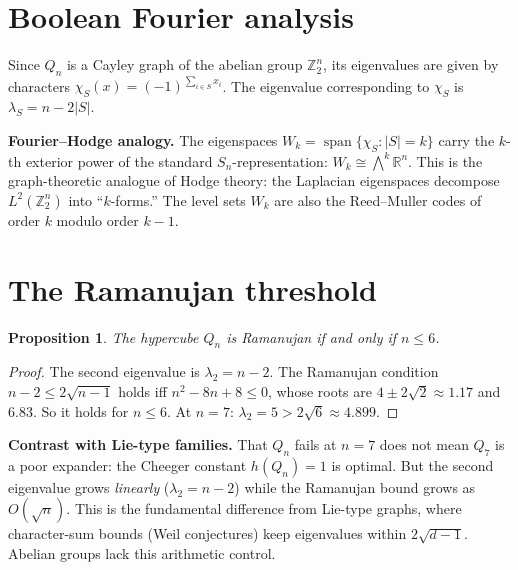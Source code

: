 \documentclass[11pt,a4paper]{article}
\theoremstyle{plain}
\newtheorem{proposition}[theorem]{Proposition}
\theoremstyle{definition}
\theoremstyle{remark}
\newcommand{\Z}{\mathbb{Z}}
\newcommand{\R}{\mathbb{R}}
\begin{document}
\section{Boolean Fourier analysis}

Since $Q_n$ is a Cayley graph of the abelian group $\Z_2^n$, its eigenvalues
are given by characters $\chi_S(x) = (-1)^{\sum_{i \in S} x_i}$.
The eigenvalue corresponding to $\chi_S$ is $\lambda_S = n - 2|S|$.

\begin{tcolorbox}[colback=yellow!10, colframe=yellow!10,
  boxrule=0pt, sharp corners]
\textbf{Fourier--Hodge analogy.}
The eigenspaces $W_k = \operatorname{span}\{\chi_S : |S| = k\}$ carry
the $k$-th exterior power of the standard $S_n$-representation:
$W_k \cong \bigwedge^k \R^n$. This is the graph-theoretic analogue of
Hodge theory: the Laplacian eigenspaces decompose $L^2(\Z_2^n)$ into
``$k$-forms.'' The level sets $W_k$ are also the Reed--Muller codes of
order $k$ modulo order $k-1$.
\end{tcolorbox}


\section{The Ramanujan threshold}

\begin{tcolorbox}[colback=black!5, colframe=black!5,
  boxrule=0pt, sharp corners]
\begin{proposition}
The hypercube $Q_n$ is Ramanujan if and only if $n \le 6$.
\end{proposition}
\begin{proof}
The second eigenvalue is $\lambda_2 = n - 2$. The Ramanujan condition
$n - 2 \le 2\sqrt{n-1}$ holds iff $n^2 - 8n + 8 \le 0$, whose roots are
$4 \pm 2\sqrt{2} \approx 1.17$ and $6.83$. So it holds for $n \le 6$.
At $n = 7$: $\lambda_2 = 5 > 2\sqrt{6} \approx 4.899$.
\end{proof}
\end{tcolorbox}

\begin{tcolorbox}[colback=yellow!10, colframe=yellow!10,
  boxrule=0pt, sharp corners]
\textbf{Contrast with Lie-type families.}
That $Q_n$ fails at $n = 7$ does not mean $Q_7$ is a poor expander:
the Cheeger constant $h(Q_n) = 1$ is optimal.
But the second eigenvalue grows \emph{linearly} ($\lambda_2 = n - 2$) while
the Ramanujan bound grows as $O(\sqrt{n})$. This is the fundamental
difference from Lie-type graphs, where character-sum bounds (Weil
conjectures) keep eigenvalues within $2\sqrt{d-1}$.
Abelian groups lack this arithmetic control.
\end{tcolorbox}
\end{document}
